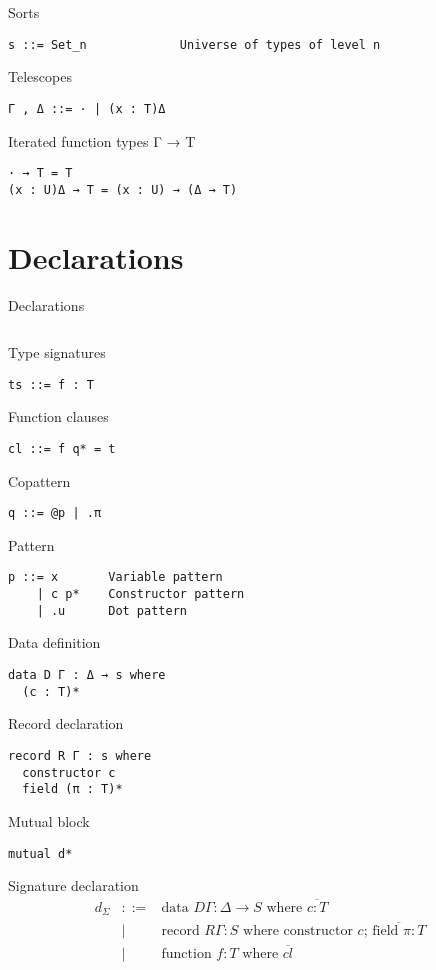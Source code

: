 \documentclass[acmlarge]{acmart}\settopmatter{}
\renewcommand{\|}{|}
\begin{document}
Sorts
\begin{verbatim}
s ::= Set_n             Universe of types of level n
\end{verbatim}

Telescopes
\begin{verbatim}
Γ , Δ ::= · | (x : T)Δ
\end{verbatim}

Iterated function types Γ → T
\begin{verbatim}
· → T = T
(x : U)Δ → T = (x : U) → (Δ → T)
\end{verbatim}

\section{Declarations}
\label{sec:declarations}

Declarations
\begin{verbatim}

\end{verbatim}

Type signatures
\begin{verbatim}
ts ::= f : T
\end{verbatim}

Function clauses
\begin{verbatim}
cl ::= f q* = t
\end{verbatim}

Copattern
\begin{verbatim}
q ::= @p | .π 
\end{verbatim}

Pattern
\begin{verbatim}
p ::= x       Variable pattern
    | c p*    Constructor pattern
    | .u      Dot pattern
\end{verbatim}

Data definition
\begin{verbatim}
data D Γ : Δ → s where 
  (c : T)*
\end{verbatim}

Record declaration
\begin{verbatim}
record R Γ : s where
  constructor c
  field (π : T)*
\end{verbatim}

Mutual block
\begin{verbatim}
mutual d*
\end{verbatim}

Signature declaration
\[
\begin{array}{lcl}
d_\Sigma & ::= & \text{data } D\Gamma: \Delta \to S \text{ where } \overline{c : T} \\
& \| & \text{record } R\Gamma : S \text{ where constructor $c$; } \overline{\text{field }\pi : T} \\
& \| & \text{function } f : T \text{ where } \overline{cl}
\end{array}
\]
\end{document}
